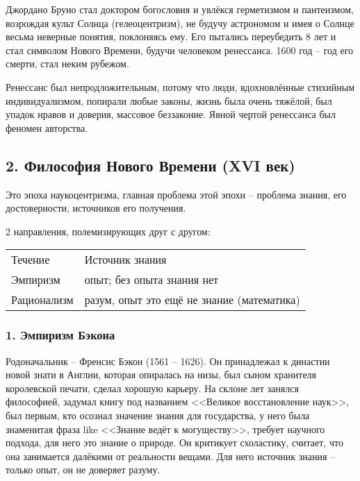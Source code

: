 \documentclass[a4paper, 12pt]{book} %
\begin{document}
Джордано Бруно стал доктором богословия и увлёкся герметизмом и пантеизмом, возрождая культ Солнца (гелеоцентризм), не будучу астрономом и имея о Солнце весьма неверные понятия, поклоняясь ему. Его пытались переубедить 8 лет и стал символом Нового Времени, будучи человеком ренессанса. 1600 год -- год его смерти, стал неким рубежом.

Ренессанс был непродложительным, потому что люди, вдохновлённые стихийным индивидуализмом, попирали любые законы, жизнь была очень тяжёлой, был упадок нравов и доверия, массовое беззаконие. Явной чертой ренессанса был феномен авторства. 
\newpage
\subsection*{2. Философия Нового Времени (XVI век)}
Это эпоха наукоцентризма, главная проблема этой эпохи -- проблема знания, его достоверности, источников его получения.

2 направления, полемизирующих друг с другом:

\begin{table}[]
\begin{tabular}{ll}
Течение     & Источник знания                            \\
Эмпиризм    & опыт; без опыта знания нет                 \\
Рационализм & разум, опыт это ещё не знание (математика)
\end{tabular}
\end{table}

\subsubsection*{1. Эмпиризм Бэкона}
Родоначальник -- Френсис Бэкон (1561 -- 1626). Он принадлежал к династии новой знати в Англии, которая опиралась на низы, был сыном хранителя королевской печати, сделал хорошую карьеру. На склоне лет занялся философией, задумал книгу под названием <<Великое восстановление наук>>, был первым, кто осознал значение знания для государства, у него была знаменитая фраза like <<Знание ведёт к могуществу>>, требует научного подхода, для него это знание о природе. Он критикует схоластику, считает, что она занимается далёкими от реальности вещами. Для него источник знания -- только опыт, он не доверяет разуму.
\end{document}
